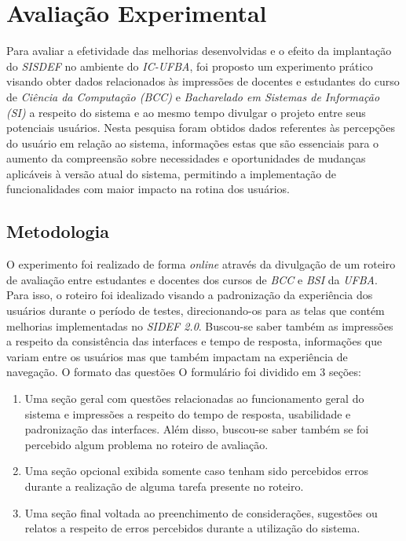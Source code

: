 \documentclass[nonacm, sigconf]{acmart}
\begin{document}
\section{Avaliação Experimental}
\label{section:results}

Para avaliar a efetividade das melhorias desenvolvidas e o efeito da implantação do \textit{SISDEF} no ambiente do \textit{IC-UFBA}, foi proposto um experimento prático visando obter dados relacionados às impressões de docentes e estudantes do curso de \textit{Ciência da Computação (BCC)} e \textit{Bacharelado em Sistemas de Informação (SI)} a respeito do sistema e ao mesmo tempo divulgar o projeto entre seus potenciais usuários. 
Nesta pesquisa foram obtidos dados referentes às percepções do usuário em relação ao sistema, informações estas que são essenciais para o aumento da compreensão sobre necessidades e oportunidades de mudanças aplicáveis à versão atual do sistema, permitindo a implementação de funcionalidades com maior impacto na rotina dos usuários.

\subsection{Metodologia}
\label{section:methodology}

O experimento foi realizado de forma \textit{online} através da divulgação de um roteiro de avaliação entre estudantes e docentes dos cursos de \textit{BCC} e \textit{BSI} da \textit{UFBA}. Para isso, o roteiro foi idealizado visando a padronização da experiência dos usuários durante o período de testes, direcionando-os para as telas que contém melhorias implementadas no \textit{SIDEF 2.0}. Buscou-se saber também as impressões a respeito da consistência das interfaces e tempo de resposta, informações que variam entre os usuários mas que também impactam na experiência de navegação. O formato das questões O formulário foi dividido em 3 seções:

\begin{enumerate}
  \item Uma seção geral com questões relacionadas ao funcionamento geral do sistema e impressões a respeito do tempo de resposta, usabilidade e padronização das interfaces. Além disso, buscou-se saber também se foi percebido algum problema no roteiro de avaliação.
  \item Uma seção opcional exibida somente caso tenham sido percebidos erros durante a realização de alguma tarefa presente no roteiro.
  \item Uma seção final voltada ao preenchimento de considerações, sugestões ou relatos a respeito de erros percebidos durante a utilização do sistema.
\end{enumerate}
\end{document}
